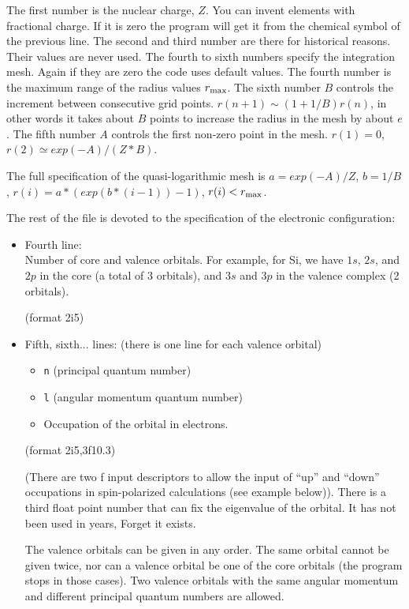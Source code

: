 \documentclass[11pt]{article}
\begin{document}
\begin{itemize}
The first number is the nuclear charge, $Z$.  You can invent elements with fractional charge.
If it is zero the program will get it from the chemical symbol of the previous line.
The second and third number are there for historical reasons.  Their values are
never used.  The fourth to sixth numbers specify the integration mesh.
Again if they are zero the code uses default values.
The fourth number is the maximum range of the radius values $r_{\rm max}$.
The sixth number $B$ controls the increment between consecutive grid points.
$r(n+1) \sim (1+1/B) r(n)$, in other words it takes about $B$ points to increase the
radius in the mesh by about $e$.  The fifth number $A$ controls the first non-zero
point in the mesh. $r(1) = 0$, $r(2) \simeq exp(-A)/(Z*B)$.

The full specification of the quasi-logarithmic mesh is
$a = exp(-A)/Z$, $b = 1/B$, $r(i) = a*(exp(b*(i-1))-1)$, $r(i) < r_{\rm max}$.

\end{itemize}

The rest of the file is devoted to the specification of the electronic
configuration:

\begin{itemize}

\item Fourth line:\\
	 Number of core and valence orbitals. For example, for Si, we
	have $1s$, $2s$, and $2p$ in the core (a total of 3 orbitals), and
	$3s$ and $3p$ in the valence complex (2 orbitals).

	(format 2i5)

\item Fifth, sixth... lines: (there is one line for each valence
orbital)
	\begin{itemize}
	\item {\tt n} (principal quantum number)
	\item {\tt l} (angular momentum quantum number)
	\item Occupation of the orbital in electrons.
	\end{itemize}

	(format 2i5,3f10.3)

	(There are two f input descriptors to allow the input of ``up''
	and ``down'' occupations in spin-polarized calculations (see
	example below)).
	There is a third float point number that can fix the eigenvalue of the orbital.
	It has not been used in years,  Forget it exists.

	The valence orbitals can be given in any order.  The same orbital
	cannot be given twice, nor can a valence orbital be one of the core orbitals
	(the program stops in those cases).  Two valence orbitals with the same
	angular momentum and different principal quantum numbers are allowed.

\end{itemize}
\end{document}
